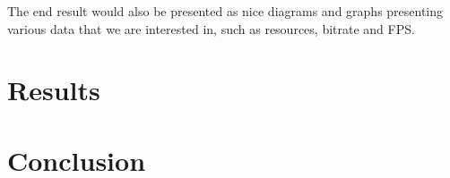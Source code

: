 \documentclass{LTHthesis}
\begin{document}
The end result would also be presented as nice diagrams and graphs presenting various data that we are interested in, such as resources, bitrate and FPS.

\chapter{Results}

\chapter{Conclusion}

\printbibliography  %
%
%
\end{document}
